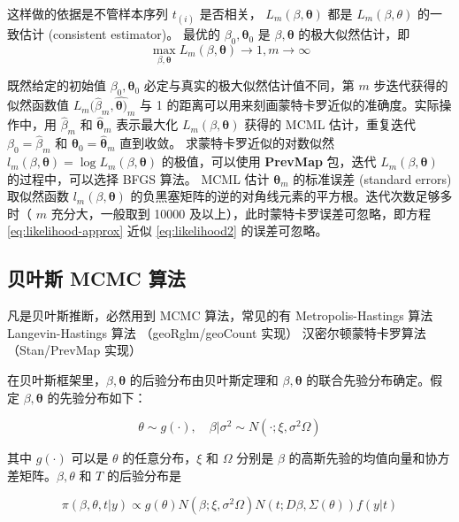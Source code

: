 \documentclass[12pt,a4paper,UTF8,twoside]{book}
\theoremstyle{definition}
\theoremstyle{definition}
\theoremstyle{definition}
\theoremstyle{remark}
\begin{document}
\noindent 这样做的依据是不管样本序列 \(t_{(i)}\) 是否相关，
\(L_{m}(\beta,\boldsymbol{\theta})\) 都是 \(L_{m}(\beta,\theta)\)
的一致估计 (consistent estimator)。 最优的
\(\beta_0,\boldsymbol{\theta}_0\) 是 \(\beta,\boldsymbol{\theta}\)
的极大似然估计，即 \[
\max_{\beta,\boldsymbol{\theta}}L_{m}(\beta,\boldsymbol{\theta}) \rightarrow 1, m \rightarrow\infty
\]

\noindent 既然给定的初始值 \(\beta_{0},\boldsymbol{\theta}_{0}\)
必定与真实的极大似然估计值不同，第 \(m\) 步迭代获得的似然函数值
\(L_{m}(\hat{\beta}_{m}, \hat{\boldsymbol{\theta})}_{m}\) 与 1
的距离可以用来刻画蒙特卡罗近似的准确度。实际操作中，用
\(\hat{\beta}_{m}\) 和 \(\hat{\boldsymbol{\theta}}_{m}\) 表示最大化
\(L_{m}(\beta, \boldsymbol{\theta})\) 获得的 MCML 估计，重复迭代
\(\beta_{0} = \hat{\beta}_{m}\) 和
\(\boldsymbol{\theta}_{0} = \hat{\boldsymbol{\theta}}_{m}\) 直到收敛。
求蒙特卡罗近似的对数似然
\(l_{m}(\beta, \boldsymbol{\theta}) = \log L_{m}(\beta, \boldsymbol{\theta})\)
的极值，可以使用 \textbf{PrevMap} 包，迭代
\(L_{m}(\beta, \boldsymbol{\theta})\) 的过程中，可以选择 BFGS 算法。
MCML 估计 \(\boldsymbol{\theta}_{m}\) 的标准误差 (standard errors)
取似然函数 \(l_{m}(\beta,\boldsymbol{\theta})\)
的负黑塞矩阵的逆的对角线元素的平方根。迭代次数足够多时（ \(m\)
充分大，一般取到 10000 及以上），此时蒙特卡罗误差可忽略，即方程
\eqref{eq:likelihood-approx} 近似 \eqref{eq:likelihood2} 的误差可忽略。

\hypertarget{MCMC}{%
\subsection{贝叶斯 MCMC 算法}\label{MCMC}}

凡是贝叶斯推断，必然用到 MCMC 算法，常见的有 Metropolis-Hastings 算法
\citep{Diggle1998, Diggle2002Childhood} Langevin-Hastings 算法
（geoRglm/geoCount 实现） 汉密尔顿蒙特卡罗算法 （Stan/PrevMap 实现）

在贝叶斯框架里，\(\beta, \boldsymbol{\theta}\) 的后验分布由贝叶斯定理和
\(\beta, \boldsymbol{\theta}\) 的联合先验分布确定。假定
\(\beta, \boldsymbol{\theta}\) 的先验分布如下：

\[
\theta \sim  g(\cdot), \quad \beta | \sigma^2 \sim  N(\cdot; \xi, \sigma^2 \Omega)
\]

\noindent 其中 \(g(\cdot)\) 可以是 \(\theta\) 的任意分布，\(\xi\) 和
\(\Omega\) 分别是 \(\beta\)
的高斯先验的均值向量和协方差矩阵。\(\beta, \theta\) 和 \(T\)
的后验分布是

\begin{equation}
\pi(\beta, \theta, t | y) \propto g(\theta)N(\beta; \xi, \sigma^2 \Omega)N(t; D\beta, \Sigma(\theta))f(y|t) \label{eq:posterior}
\end{equation}
\end{document}
